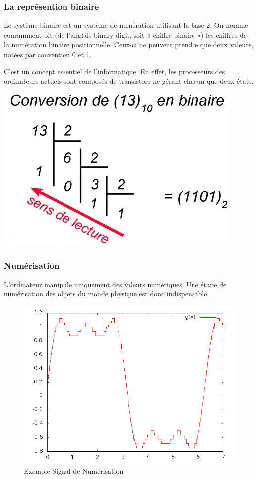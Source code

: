 \documentclass[a4paper, 12pt]{article}
\begin{document}
  \subsubsection{La représention binaire}
  	Le système binaire est un système de numération utilisant la base 2. On nomme couramment bit (de l'anglais binary digit, soit « chiffre binaire ») les chiffres de la numération binaire positionnelle. Ceux-ci ne peuvent prendre que deux valeurs, notées par convention 0 et 1.

C'est un concept essentiel de l'informatique. En effet, les processeurs des ordinateurs actuels sont composés de transistors ne gérant chacun que deux états.
\vfill
\begin{flushright} \includegraphics[scale=0.5]{isn2.jpg} \end{flushright}
\vfill
  	
  	\subsubsection{Numérisation}
  L'ordinateur \cite{ISN2} manipule uniquement des valeurs numériques. Une étape de numérisation des objets du monde physique est donc indispensable.
  \begin{figure}[!h]
  \centering
  \includegraphics[scale=0.3]{graphe1.png}
  \caption{Exemple Signal de Numérisation}
  \end{figure}
  
\end{document}
